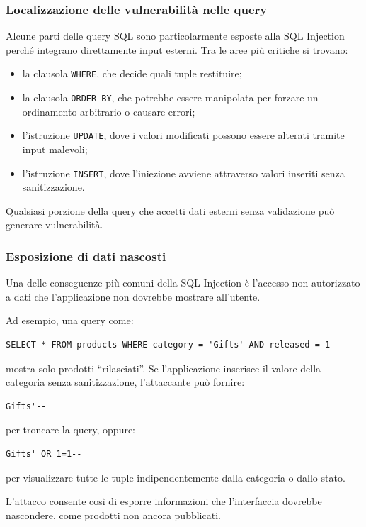 \subsubsection{Localizzazione delle vulnerabilità nelle query}

Alcune parti delle query SQL sono particolarmente esposte alla SQL Injection perché integrano direttamente input esterni. Tra le aree più critiche si trovano:
\begin{itemize}
    \item la clausola \texttt{WHERE}, che decide quali tuple restituire;
    \item la clausola \texttt{ORDER BY}, che potrebbe essere manipolata per forzare un ordinamento arbitrario o causare errori;
    \item l’istruzione \texttt{UPDATE}, dove i valori modificati possono essere alterati tramite input malevoli;
    \item l’istruzione \texttt{INSERT}, dove l’iniezione avviene attraverso valori inseriti senza sanitizzazione.
\end{itemize}
Qualsiasi porzione della query che accetti dati esterni senza validazione può generare vulnerabilità.

\subsubsection{Esposizione di dati nascosti}

Una delle conseguenze più comuni della SQL Injection è l’accesso non autorizzato a dati che l’applicazione non dovrebbe mostrare all’utente.

Ad esempio, una query come:
\begin{verbatim}
SELECT * FROM products WHERE category = 'Gifts' AND released = 1
\end{verbatim}
mostra solo prodotti “rilasciati”.
Se l’applicazione inserisce il valore della categoria senza sanitizzazione, l’attaccante può fornire:
\begin{verbatim}
Gifts'--
\end{verbatim}
per troncare la query, oppure:
\begin{verbatim}
Gifts' OR 1=1--
\end{verbatim}
per visualizzare tutte le tuple indipendentemente dalla categoria o dallo stato.

L’attacco consente così di esporre informazioni che l’interfaccia dovrebbe nascondere, come prodotti non ancora pubblicati.

